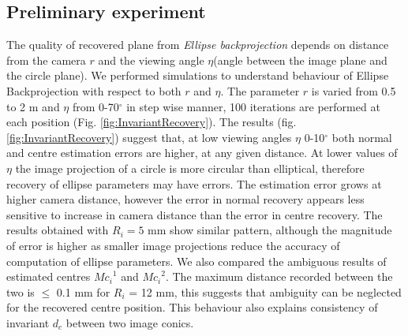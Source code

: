 \documentclass{bmvc2k}
\begin{document}
\subsection{Preliminary experiment}
The quality of recovered plane from \textit{Ellipse backprojection} depends on distance from the camera $ r $ and the viewing angle $ \eta $(angle between the image plane and the circle plane)\cite{werghi_pose_1996}. 
We performed simulations to understand behaviour of Ellipse Backprojection with respect to both $ r $ and $ \eta $. 
The parameter $ r $ is varied from 0.5 to 2 m and $ \eta $ from 0-70$^\circ$ in step wise manner, 100 iterations are performed at each position (Fig. \ref{fig:InvariantRecovery}). 
The results (fig. \ref{fig:InvariantRecovery}) suggest that, at low viewing angles $ \eta $ 0-10$^\circ$ both normal and centre estimation errors are higher, at any given distance. 
At lower values of $ \eta $ the image projection of a circle is more circular than elliptical, therefore recovery of ellipse parameters may have errors. 
The estimation error grows at higher camera distance, however the error in normal recovery appears less sensitive to increase in camera distance than the error in centre recovery. 
The results obtained with $ R_i = 5$ mm show similar pattern, although the magnitude of error is higher as smaller image projections reduce the accuracy of computation of ellipse parameters.  
We also compared the ambiguous results of estimated centres $ {Mc_i}^1 $ and $ {Mc_i}^2 $. 
The maximum distance recorded between the two is $ \leq $  0.1 mm for $R_i$ = 12 mm, this suggests that ambiguity can be neglected for the recovered centre position. 
This behaviour also explains consistency of invariant $ d_c $ between two image conics. 
\end{document}
